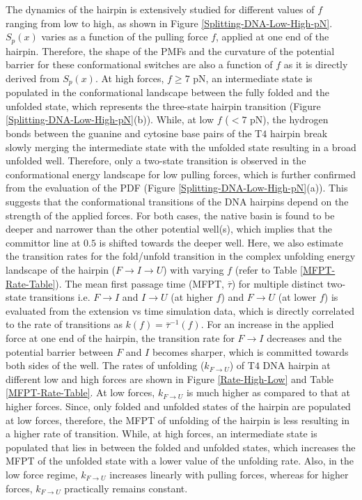 \documentclass[twoside,twocolumn,9pt]{article}
\begin{document}
The dynamics of the hairpin is extensively studied for different values of $f$ ranging from low to high,
as shown in Figure \ref{Splitting-DNA-Low-High-pN}. $S_{p}(x)$ varies as a function of the pulling force $f$, 
applied at one end of the hairpin. Therefore, the shape of the PMFs and the curvature of the potential barrier
for these conformational switches are also a function of $f$ as it is directly derived from $S_{p}(x)$.
At high forces, $f\ge{7}$ pN, an intermediate state is populated in the conformational 
landscape between the fully folded and the unfolded state, which represents the three-state hairpin transition 
(Figure \ref{Splitting-DNA-Low-High-pN}(b)). 
While, at low $f$ ($<{7}$ pN), the hydrogen bonds between the guanine and cytosine base pairs of the T$4$ hairpin break 
slowly merging the intermediate state with the unfolded state resulting in a broad unfolded well. Therefore, only 
a two-state transition is observed in the conformational energy landscape for low pulling forces, which is 
further confirmed from the evaluation of the PDF (Figure \ref{Splitting-DNA-Low-High-pN}(a)). 
This suggests that the conformational transitions of the DNA hairpins depend on the strength of the applied forces. 
For both cases, the native basin is found to be deeper and narrower than the other potential well(s), which implies 
that the committor line at $0.5$ is shifted towards the deeper well. Here, we also estimate the transition 
rates for the fold/unfold transition in the complex unfolding energy landscape of the hairpin (${F}\to{I}\to{U}$) with varying 
$f$ (refer to Table \ref{MFPT-Rate-Table}). The mean first passage time (MFPT, $\overline{\tau}$) for multiple distinct two-state
transitions i.e. $F\to{I}$ and $I\to{U}$ (at higher $f$) and $F\to{U}$ (at lower $f$) is evaluated from the 
extension vs time simulation data, which is directly correlated to the rate of transitions as 
$k(f)={\overline{\tau}^{-1}}(f)$. 
For an increase in the applied force at one end of the hairpin, the transition rate for $F\to{I}$ decreases and the 
potential barrier between $F$ and $I$ becomes sharper, which is committed towards both sides of the well.
The rates of unfolding ($k_{F\to{U}}$) of T$4$ DNA hairpin at different low and high forces are shown in Figure 
\ref{Rate-High-Low} and Table \ref{MFPT-Rate-Table}. At low forces, $k_{F\to{U}}$ is much higher as compared to that at higher 
forces. Since, only folded and unfolded states of the hairpin are populated at low forces, therefore, 
the MFPT of unfolding of the hairpin is less resulting in a higher rate of transition. While, at high forces, 
an intermediate state is populated that lies in between the folded and unfolded states, which increases the MFPT of the 
unfolded state with a lower value of the unfolding rate. Also, in the low force regime,
$k_{F\to{U}}$ increases linearly with pulling forces, whereas for higher forces, $k_{F\to{U}}$ practically 
remains constant.
\end{document}
